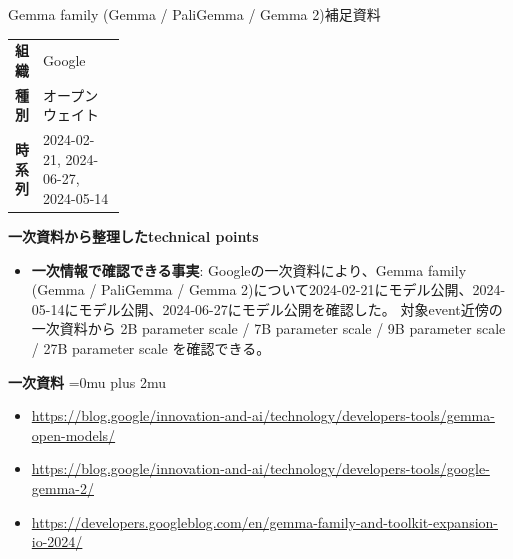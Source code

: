 \begin{technicalnote}{Gemma family (Gemma / PaliGemma / Gemma 2)}{補足資料}
\begingroup
\begin{tabularx}{\linewidth}{@{}>{\bfseries}p{0.22\linewidth}X@{}}
組織 & Google \\
種別 & オープンウェイト \\
時系列 & 2024-02-21, 2024-06-27, 2024-05-14 \\
\end{tabularx}
\smallskip
\begin{minipage}{\linewidth}
{\bfseries 一次資料から整理したtechnical points}
\begin{itemize}[leftmargin=1.5em,itemsep=0.35em]
\item \textbf{一次情報で確認できる事実}: Googleの一次資料により、Gemma family (Gemma / PaliGemma / Gemma 2)について2024-02-21にモデル公開、2024-05-14にモデル公開、2024-06-27にモデル公開を確認した。 対象event近傍の一次資料から 2B parameter scale / 7B parameter scale / 9B parameter scale / 27B parameter scale を確認できる。
\end{itemize}
\begin{minipage}{\linewidth}
\begin{samepage}
{\bfseries 一次資料}
\begingroup\sloppy
\Urlmuskip=0mu plus 2mu\relax
\begin{itemize}[leftmargin=1.5em,itemsep=0.25em]
\item {\scriptsize\url{https://blog.google/innovation-and-ai/technology/developers-tools/gemma-open-models/}}
\item {\scriptsize\url{https://blog.google/innovation-and-ai/technology/developers-tools/google-gemma-2/}}
\item {\scriptsize\url{https://developers.googleblog.com/en/gemma-family-and-toolkit-expansion-io-2024/}}
\end{itemize}
\endgroup
\end{samepage}
\end{minipage}
\end{minipage}
\endgroup
\end{technicalnote}
\medskip

